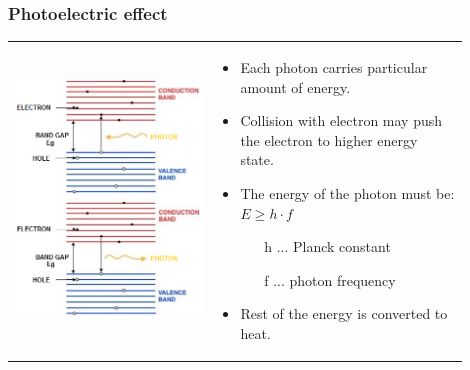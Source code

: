 \documentclass{beamer}
\begin{document}
	\begin{frame}
    \frametitle{Photoelectric effect}
		\begin{center}
			\begin{tabular}{m{0.4\linewidth} m{0.5\linewidth}}
			\includegraphics[scale=0.43]{obr10_fotoel.png} &
			\small
			\begin{itemize}
				\item Each photon carries particular amount of energy.
				\item Collision with electron may push the electron to higher energy state.
				\item The energy of the photon must be: $E \geq h\cdot f$
				
				\begin{itemize}
					\item[h]... Planck constant
					\item[f]... photon frequency
				\end{itemize}
				\item Rest of the energy is converted to heat.
			\end{itemize}
			\end{tabular}
		\end{center}
	\end{frame}
\end{document}
